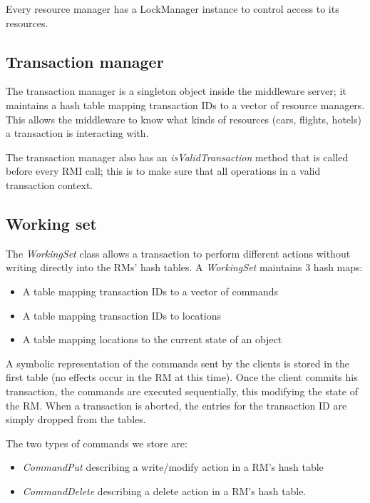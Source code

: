 \documentclass[10pt]{article}
\begin{document}
Every resource manager has a LockManager instance to control access to
its resources.

\subsection{Transaction manager}

The transaction manager is a singleton object inside the middleware
server; it maintains a hash table mapping transaction IDs to a vector
of resource managers.  This allows the middleware to know what kinds
of resources (cars, flights, hotels) a transaction is interacting
with.

The transaction manager also has an {\it isValidTransaction} method
that is called before every RMI call; this is to make sure that all
operations in a valid transaction context.

\subsection{Working set}

The {\it WorkingSet} class allows a transaction to perform different
actions without writing directly into the RMs' hash tables.  A {\it
  WorkingSet} maintains 3 hash maps:

\begin{itemize}
  \item A table mapping transaction IDs to a vector of commands
  \item A table mapping transaction IDs to locations
  \item A table mapping locations to the current state of an object
\end{itemize}

A symbolic representation of the commands sent by the clients is
stored in the first table (no effects occur in the RM at this time).
Once the client commits his transaction, the commands are executed
sequentially, this modifying the state of the RM.  When a transaction
is aborted, the entries for the transaction ID are simply dropped from
the tables.

The two types of commands we store are:

\begin{itemize}
\item {\it CommandPut} describing a write/modify action in a RM's hash
  table
\item {\it CommandDelete} describing a delete action in a RM's hash
  table.
\end{itemize}
\end{document}
